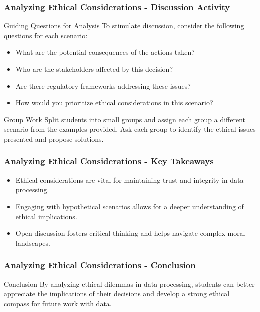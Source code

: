 \documentclass[aspectratio=169]{beamer}
\begin{document}
\begin{frame}[fragile]
    \frametitle{Analyzing Ethical Considerations - Discussion Activity}
    \begin{block}{Guiding Questions for Analysis}
        To stimulate discussion, consider the following questions for each scenario:
    \end{block}
    \begin{itemize}
        \item What are the potential consequences of the actions taken?
        \item Who are the stakeholders affected by this decision?
        \item Are there regulatory frameworks addressing these issues?
        \item How would you prioritize ethical considerations in this scenario?
    \end{itemize}

    \begin{block}{Group Work}
        Split students into small groups and assign each group a different scenario from the examples provided. 
        Ask each group to identify the ethical issues presented and propose solutions.
    \end{block}
\end{frame}

\begin{frame}[fragile]
    \frametitle{Analyzing Ethical Considerations - Key Takeaways}
    \begin{itemize}
        \item Ethical considerations are vital for maintaining trust and integrity in data processing.
        \item Engaging with hypothetical scenarios allows for a deeper understanding of ethical implications.
        \item Open discussion fosters critical thinking and helps navigate complex moral landscapes.
    \end{itemize}
\end{frame}

\begin{frame}[fragile]
    \frametitle{Analyzing Ethical Considerations - Conclusion}
    \begin{block}{Conclusion}
        By analyzing ethical dilemmas in data processing, students can better appreciate the implications of their decisions and develop a strong ethical compass for future work with data.
    \end{block}
\end{frame}
\end{document}
